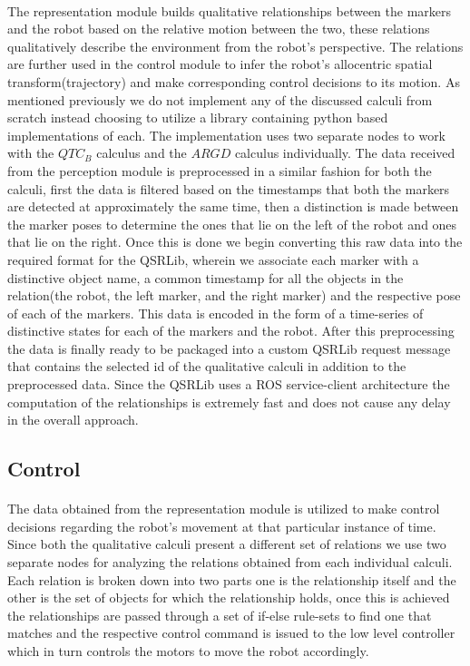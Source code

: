 \paragraph{} The representation module builds qualitative relationships between the markers and the robot based on the relative motion between the two, these relations qualitatively describe the environment from the robot's perspective. The relations are further used in the control module to infer the robot's allocentric spatial transform(trajectory) and make corresponding control decisions to its motion. As mentioned previously we do not implement any of the discussed calculi from scratch instead choosing to utilize a library containing python based implementations of each. The implementation uses two separate nodes to work with the $QTC_B$ calculus and the $ARGD$ calculus individually. The data received from the perception module is preprocessed in a similar fashion for both the calculi, first the data is filtered based on the timestamps that both the markers are detected at approximately the same time, then a distinction is made between the marker poses to determine the ones that lie on the left of the robot and ones that lie on the right. Once this is done we begin converting this raw data into the required format for the QSRLib, wherein we associate each marker with a distinctive object name, a common timestamp for all the objects in the relation(the robot, the left marker, and the right marker) and the respective pose of each of the markers. This data is encoded in the form of a time-series of distinctive states for each of the markers and the robot. After this preprocessing the data is finally ready to be packaged into a custom QSRLib request message that contains the selected id of the qualitative calculi in addition to the preprocessed data. Since the QSRLib uses a ROS service-client architecture the computation of the relationships is extremely fast and does not cause any delay in the overall approach.


\subsection{Control}
\paragraph{} The data obtained from the representation module is utilized to make control decisions regarding the robot's movement at that particular instance of time. Since both the qualitative calculi present a different set of relations we use two separate nodes for analyzing the relations obtained from each individual calculi. Each relation is broken down into two parts one is the relationship itself and the other is the set of objects for which the relationship holds, once this is achieved the relationships are passed through a set of if-else rule-sets to find one that matches and the respective control command is issued to the low level controller which in turn controls the motors to move the robot accordingly. 

